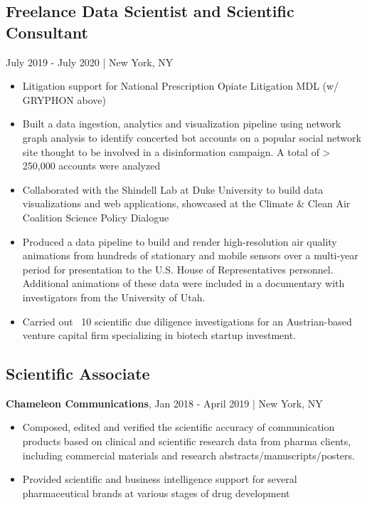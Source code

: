 \documentclass[11pt]{article}
\newenvironment{myitemize}
{ \begin{itemize}
	\setlength{\itemsep}{0pt}
	\setlength{\parskip}{0pt}
	\setlength{\parsep}{0pt}     }
{ \end{itemize}                  }
\begin{document}
\subsection*{Freelance Data Scientist and Scientific Consultant} July 2019 - July 2020 | New York, NY
\begin{myitemize}
	\item Litigation support for National Prescription Opiate Litigation MDL (w/ GRYPHON above)
	\item Built a data ingestion, analytics and visualization pipeline using network graph analysis to identify concerted bot accounts on a popular social network site thought to be involved in a disinformation campaign. A total of > 250,000 accounts were analyzed
	\item Collaborated with the Shindell Lab at Duke University to build data visualizations and 	web applications, showcased at the Climate \& Clean Air Coalition Science Policy
	Dialogue
	\item Produced a data pipeline to build and render high-resolution air quality animations from hundreds of stationary and mobile sensors over a multi-year period for presentation to the U.S. House of Representatives personnel. Additional animations of these data were included in a documentary with investigators from the University of Utah.
	\item Carried out ~10 scientific due diligence investigations for an Austrian-based venture capital firm specializing in biotech startup investment.
\end{myitemize}

\subsection*{Scientific Associate}
{\bfseries Chameleon Communications}, Jan 2018 - April 2019 | New York, NY
\begin{myitemize}
	\item Composed, edited and verified the scientific accuracy of communication products based on clinical and scientific research data from pharma clients, including commercial
	materials and research abstracts/manuscripts/posters.
	\item Provided scientific and business intelligence support for several pharmaceutical brands at various stages of drug development
\end{myitemize}
\end{document}
